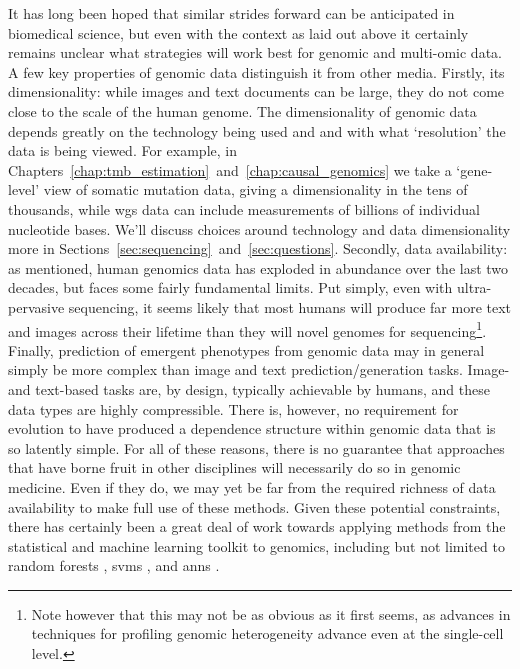 \documentclass[thesis.tex]{subfiles}
\begin{document}
It has long been hoped that similar strides forward can be anticipated in biomedical science, but even with the context as laid out above it certainly remains unclear what strategies will work best for genomic and multi-omic data. A few key properties of genomic data distinguish it from other media. Firstly, its dimensionality: while images and text documents can be large, they do not come close to the scale of the human genome. The dimensionality of genomic data depends greatly on the technology being used and and with what `resolution' the data is being viewed. For example, in Chapters~\ref{chap:tmb_estimation}~and~\ref{chap:causal_genomics} we take a `gene-level' view of somatic mutation data, giving a dimensionality in the tens of thousands, while \gls{wgs} data can include measurements of billions of individual nucleotide bases. We'll discuss choices around technology and data dimensionality more in Sections~\ref{sec:sequencing}~and~\ref{sec:questions}. Secondly, data availability: as mentioned, human genomics data has exploded in abundance over the last two decades, but faces some fairly fundamental limits. Put simply, even with ultra-pervasive sequencing, it seems likely that most humans will produce far more text and images across their lifetime than they will novel genomes for sequencing\footnote{Note however that this may not be as obvious as it first seems, as advances in techniques for profiling genomic heterogeneity advance even at the single-cell level.}. Finally, prediction of emergent phenotypes from genomic data may in general simply be more complex than image and text prediction/generation tasks. Image- and text-based tasks are, by design, typically achievable by humans, and these data types are highly compressible. There is, however, no requirement for evolution to have produced a dependence structure within genomic data that is so latently simple. For all of these reasons, there is no guarantee that approaches that have borne fruit in other disciplines will necessarily do so in genomic medicine. Even if they do, we may yet be far from the required richness of data availability to make full use of these methods.
Given these potential constraints, there has certainly been a great deal of work towards applying methods from the statistical and machine learning toolkit to genomics, including but not limited to random forests \citep{breiman_random_2001, chen_random_2012}, \glspl{svm} \citep{cortes_support-vector_1995, huang_applications_2018}, and \glspl{ann} \citep{avsec_effective_2021, tran_deep_2021}. 
 
\end{document}
